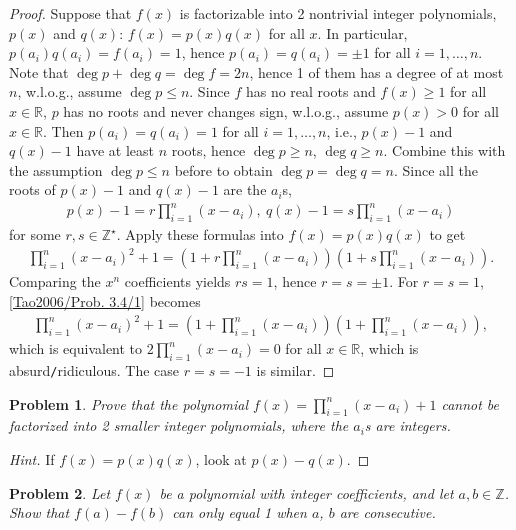 \documentclass[oneside]{book}
\numberwithin{equation}{section}
\newtheorem{problem}{Problem}[section]
\begin{document}
\begin{proof}[Proof]
	Suppose that $f(x)$ is factorizable into 2 nontrivial integer polynomials, $p(x)$ and $q(x)$: $f(x) = p(x)q(x)$ for all $x$. In particular, $p(a_i)q(a_i) = f(a_i) = 1$, hence $p(a_i) = q(a_i) = \pm1$ for all $i = 1,\ldots,n$. Note that $\deg p + \deg q = \deg f = 2n$, hence 1 of them has a degree of at most $n$, w.l.o.g., assume $\deg p\le n$. Since $f$ has no real roots and $f(x)\ge 1$ for all $x\in\mathbb{R}$, $p$ has no roots and never changes sign, w.l.o.g., assume $p(x) > 0$ for all $x\in\mathbb{R}$. Then $p(a_i) = q(a_i) = 1$ for all $i = 1,\ldots,n$, i.e., $p(x) - 1$ and $q(x) - 1$ have at least $n$ roots, hence $\deg p\ge n$, $\deg q\ge n$. Combine this with the assumption $\deg p\le n$ before to obtain $\deg p = \deg q = n$. Since all the roots of $p(x) - 1$ and $q(x) - 1$ are the $a_i$s,
	\begin{align*}
		p(x) - 1 = r\prod_{i=1}^n (x - a_i),\ q(x) - 1 = s\prod_{i=1}^n (x - a_i)
	\end{align*}
	for some $r,s\in\mathbb{Z}^\star$. Apply these formulas into $f(x) = p(x)q(x)$ to get
	\begin{align}
		\label{Tao2006/Prob. 3.4/1}
		\prod_{i=1}^n (x - a_i)^2 + 1 = \left(1 + r\prod_{i=1}^n (x - a_i)\right)\left(1 + s\prod_{i=1}^n (x - a_i)\right).
	\end{align}
	Comparing the $x^n$ coefficients yields $rs = 1$, hence $r = s = \pm 1$. For $r = s = 1$, \eqref{Tao2006/Prob. 3.4/1} becomes
	\begin{align}
		\label{Tao2006/Prob. 3.4/2}
		\prod_{i=1}^n (x - a_i)^2 + 1 = \left(1 + \prod_{i=1}^n (x - a_i)\right)\left(1 + \prod_{i=1}^n (x - a_i)\right),
	\end{align}
	which is equivalent to $2\prod_{i=1}^n (x - a_i) = 0$ for all $x\in\mathbb{R}$, which is absurd\texttt{/}ridiculous. The case $r = s = -1$ is similar. 
\end{proof}

\begin{problem}
	Prove that the polynomial $f(x) = \prod_{i=1}^n (x - a_i) + 1$ cannot be factorized into 2 smaller integer polynomials, where the $a_i$s are integers.
\end{problem}

\begin{proof}[Hint]
	If $f(x) = p(x)q(x)$, look at $p(x) - q(x)$.
\end{proof}

\begin{problem}
	Let $f(x)$ be a polynomial with integer coefficients, and let $a,b\in\mathbb{Z}$. Show that $f(a) - f(b)$ can only equal 1 when $a$, $b$ are consecutive.
\end{problem}
\end{document}
